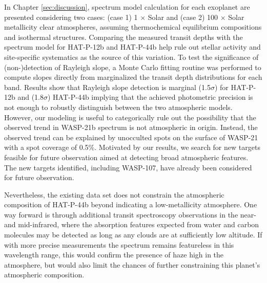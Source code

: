 In Chapter \ref{sec:discussion}, spectrum model calculation for each exoplanet are presented considering two cases: (case 1) 1 $\times$ Solar and (case 2) 100 $\times$ Solar metallicity clear atmospheres, assuming thermochemical equilibrium compositions and isothermal structures. Comparing the measured transit depths with the spectrum model for HAT-P-12b and HAT-P-44b help rule out stellar activity and site-specific systematics as the source of this variation. 
To test the significance of (non-)detection of Rayleigh slope, a Monte Carlo fitting routine was performed to compute slopes directly from marginalized the transit depth distributions for each band. Results show that Rayleigh slope detection is marginal (1.5$\sigma$) for HAT-P-12b and (1.8$\sigma$) HAT-P-44b implying that the achieved photometric precision is not enough to robustly distinguish between the two atmospheric models. %
However, our modeling is useful to categorically rule out the possibility that the observed trend in WASP-21b spectrum is not atmospheric in origin. Instead, the observed trend can be explained by unocculted spots on the surface of WASP-21 with a spot coverage of 0.5\%. Motivated by our results, we search for new targets feasible for future observation aimed at detecting broad atmospheric features. The new targets identified, including WASP-107, have already been considered for future observation.



Nevertheless, the existing data set does not constrain the atmospheric composition of HAT-P-44b beyond indicating a low-metallicity atmosphere. One way forward is through additional transit spectroscopy observations in the near- and mid-infrared, where the absorption features expected from water and carbon molecules may be detected as long as any clouds are at sufficiently low altitude. If with more precise measurements the spectrum remains featureless in this wavelength range, this would confirm the presence of haze high in the atmosphere, but would also limit the chances of further constraining this planet’s atmospheric composition.

